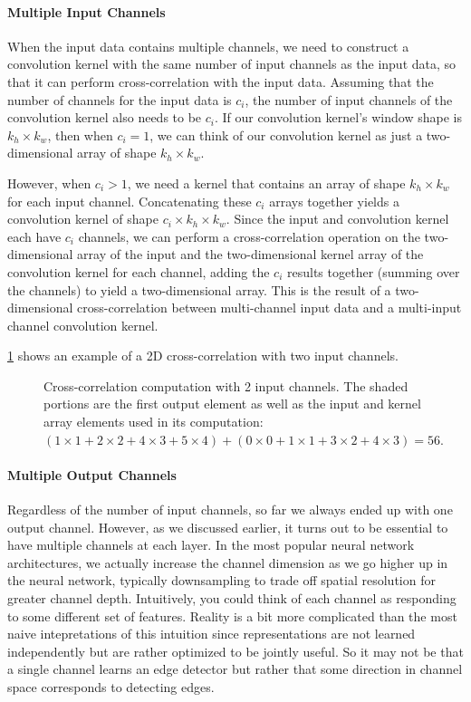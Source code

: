 \paragraph{Multiple Input Channels}

When the input data contains multiple channels, we need to construct a convolution kernel with the same number of input channels as the input data, so that it can perform cross-correlation with the input data. Assuming that the number of channels for the input data is $c_i$, the number of input channels of the convolution kernel also needs to be $c_i$. If our convolution kernel’s window shape is $k_h\times k_w$, then when $c_i=1$, we can think of our convolution kernel as just a two-dimensional array of shape $k_h\times k_w$.

However, when $c_i>1$, we need a kernel that contains an array of shape $k_h\times k_w$ for each input channel. Concatenating these $c_i$ arrays together yields a convolution kernel of shape $c_i\times k_h\times k_w$. Since the input and convolution kernel each have $c_i$ channels, we can perform a cross-correlation operation on the two-dimensional array of the input and the two-dimensional kernel array of the convolution kernel for each channel, adding the $c_i$ results together (summing over the channels) to yield a two-dimensional array. This is the result of a two-dimensional cross-correlation between multi-channel input data and a multi-input channel convolution kernel.

\cref{fig:conv_multi_in} shows an example of a 2D cross-correlation with two input channels. 

\begin{figure}[hpt]
	\centering
	
	\caption{Cross-correlation computation with 2 input channels. The shaded portions are the first output element as well as the input and kernel array elements used in its computation:  $(1 \times 1+2 \times 2+4\times3+5\times4)+(0\times0+1 \times 1+3\times2+4\times3)=56.$}
	\label{fig:conv_multi_in}
\end{figure}

\paragraph{Multiple Output Channels}

Regardless of the number of input channels, so far we always ended up with one output channel. However, as we discussed earlier, it turns out to be essential to have multiple channels at each layer. In the most popular neural network architectures, we actually increase the channel dimension as we go higher up in the neural network, typically downsampling to trade off spatial resolution for greater channel depth. Intuitively, you could think of each channel as responding to some different set of features. Reality is a bit more complicated than the most naive intepretations of this intuition since representations are not learned independently but are rather optimized to be jointly useful. So it may not be that a single channel learns an edge detector but rather that some direction in channel space corresponds to detecting edges.

